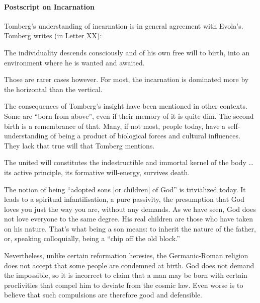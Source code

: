 \paragraph{Postscript on Incarnation}
Tomberg's understanding of incarnation is in general agreement with Evola's. Tomberg writes (in Letter XX):

\begin{quotex}
The individuality descends consciously and of his own free will to birth, into an environment where he is wanted and awaited.

\end{quotex}
Those are rarer cases however. For most, the incarnation is dominated more by the horizontal than the vertical.

The consequences of Tomberg's insight have been mentioned in other contexts. Some are “born from above”, even if their memory of it is quite dim. The second birth is a remembrance of that. Many, if not most, people today, have a self-understanding of being a product of biological forces and cultural influences. They lack that true will that Tomberg mentions.

\begin{quotex}
The united will constitutes the indestructible and immortal kernel of the body … its active principle, its formative will-energy, survives death.

\end{quotex}
The notion of being “adopted sons [or children] of God” is trivialized today. It leads to a spiritual infantilisation, a pure passivity, the presumption that God loves you just the way you are, without any demands. As we have seen, God does not love everyone to the same degree. His real children are those who have taken on his nature. That's what being a son means: to inherit the nature of the father, or, speaking colloquially, being a “chip off the old block.”

Nevertheless, unlike certain reformation heresies, the Germanic-Roman religion does not accept that some people are condemned at birth. God does not demand the impossible, so it is incorrect to claim that a man may be born with certain proclivities that compel him to deviate from the cosmic law. Even worse is to believe that such compulsions are therefore good and defensible.

